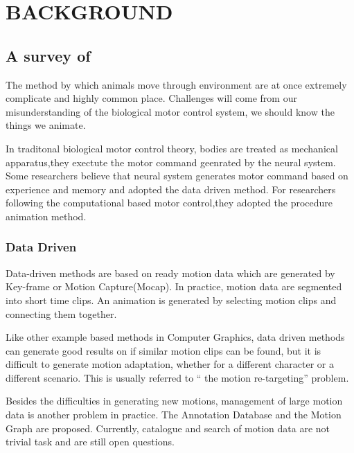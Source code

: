\chapter{BACKGROUND}
\label{chap:background}

\section{A survey of \cms}

The method by which animals move through environment are at once extremely complicate and highly common place.
Challenges will come from our misunderstanding of the biological motor control system, we should know the things we animate.

In traditonal biological motor control theory, bodies are treated as mechanical apparatus,they exectute the motor command geenrated by the neural system.
Some researchers believe that neural system generates motor command based on experience and memory and adopted the data driven method.
For researchers following the computational based motor control,they adopted the procedure animation method.
\subsection{Data Driven}
Data-driven methods are based on ready motion data which are generated by Key-frame or Motion Capture(Mocap). 
In practice, motion data are segmented into short time clips. 
An animation is generated by selecting motion clips and connecting them together\citep{Parent2002}.

Like other example based methods in Computer Graphics, data driven methods can generate good results on if similar motion clips can be found, but it is difficult to generate  motion adaptation, whether for a different character or a different scenario. 
This is usually referred to `` the motion re-targeting'' problem.

Besides the difficulties in generating new motions, management of large motion data is another problem in practice. 
The Annotation Database \citep{Arikan2003} and the Motion Graph \citep{kovar2008motion}are proposed. 
Currently, catalogue and search of motion data are not trivial task and are still open questions.

